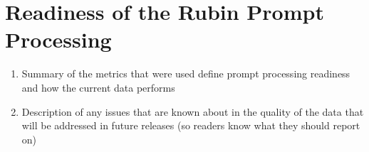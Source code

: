 \section {Readiness of the Rubin Prompt Processing}

\begin{enumerate}

    \item Summary of the metrics that were used define prompt processing readiness and how the current data performs
    \item Description of any issues that are known about in the quality of the data that will be addressed in future releases (so readers know what they should report on)   
    
 \end{enumerate}


